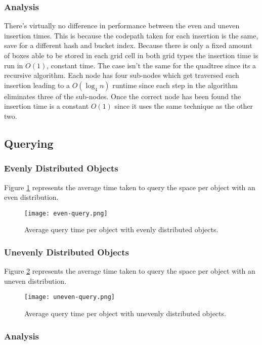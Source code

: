 \documentclass[a4paper, 12pt]{article}
\begin{document}
\subsubsection{Analysis}
There's virtually no difference in performance between the even and uneven
insertion times. This is because the codepath taken for each insertion is the
same, save for a different hash and bucket index. Because there is only a fixed
amount of boxes able to be stored in each grid cell in both grid types the
insertion time is run in $O(1)$, constant time. The case isn't the same for the
quadtree since its a recursive algorithm. Each node has four sub-nodes which get
traversed each insertion leading to a $O(\log_4 n)$ runtime since each step in
the algorithm eliminates three of the sub-nodes. Once the correct node has been
found the insertion time is a constant $O(1)$ since it uses the same technique
as the other two.

\subsection{Querying}

\subsubsection{Evenly Distributed Objects}
Figure \ref{fig:even-query} represents the average time taken to query the space
per object with an even distribution.
\begin{figure}[H]
    \centering
    \caption{Average query time per object with evenly distributed objects.}
    \texttt{[image: even-query.png]}
    \label{fig:even-query}
\end{figure}

\subsubsection{Unevenly Distributed Objects}
Figure \ref{fig:uneven-query} represents the average time taken to query the space
per object with an uneven distribution.
\begin{figure}[H]
    \centering
    \caption{Average query time per object with unevenly distributed objects.}
    \texttt{[image: uneven-query.png]}
    \label{fig:uneven-query}
\end{figure}

\subsubsection{Analysis}
\end{document}
